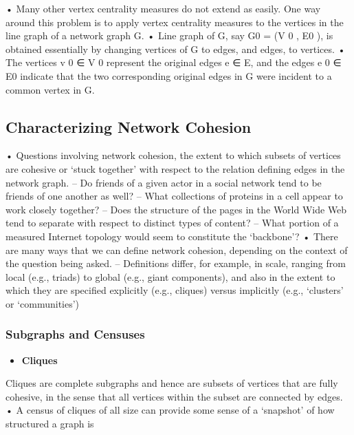 \documentclass[
]{book}
\providecommand{\tightlist}{%
  \setlength{\itemsep}{0pt}\setlength{\parskip}{0pt}}
\begin{document}
{{{• Many other vertex centrality measures do not extend as easily. One way around this problem is to apply vertex centrality measures to the vertices in the line graph of a network graph G.
• Line graph of G, say G0 = (V
0
, E0
), is obtained essentially by changing vertices of G to edges, and
edges, to vertices.
• The vertices v
0 ∈ V
0
represent the original edges e ∈ E, and the edges e
0 ∈ E0
indicate that the two corresponding original edges in G were incident to a common vertex in G.

\hypertarget{characterizing-network-cohesion}{%
\subsection{Characterizing Network Cohesion}\label{characterizing-network-cohesion}}

• Questions involving network cohesion, the extent to which subsets of vertices are cohesive or `stuck
together' with respect to the relation defining edges in the network graph.
-- Do friends of a given actor in a social network tend to be friends of one another as well?
-- What collections of proteins in a cell appear to work closely together?
-- Does the structure of the pages in the World Wide Web tend to separate with respect to
distinct types of content?
-- What portion of a measured Internet topology would seem to constitute the `backbone'?
• There are many ways that we can define network cohesion, depending on the context of the question
being asked.
-- Definitions differ, for example, in scale, ranging from local (e.g., triads) to global (e.g., giant
components), and also in the extent to which they are specified explicitly (e.g., cliques) versus
implicitly (e.g., `clusters' or `communities')

\hypertarget{subgraphs-and-censuses}{%
\subsubsection{Subgraphs and Censuses}\label{subgraphs-and-censuses}}

\begin{itemize}
\tightlist
\item
  \textbf{Cliques}
\end{itemize}

Cliques are complete subgraphs and hence are subsets of vertices that are fully cohesive, in the
sense that all vertices within the subset are connected by edges.
• A census of cliques of all size can provide some sense of a `snapshot' of how structured a graph is

}}}
\end{document}
